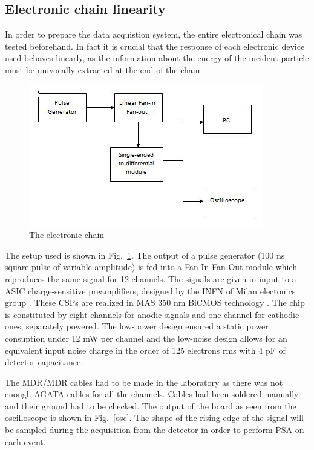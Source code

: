  \subsection{Electronic chain linearity}

In order to prepare the data acquistion system, the entire electronical chain
was tested beforehand. In fact it is crucial that the response of each
electronic device used behaves linearly, as the information about the energy
of the incident particle must be univocally extracted at the end of the chain.

\bigbreak

\begin{figure}[h]
  \centering
  \includegraphics[scale=.5]{img/electronic_chain_diagram.JPG}
  \caption{The electronic chain}
  \label{chain}
\end{figure}

\bigbreak

The setup used is shown in Fig.~\ref{chain}. The output of a pulse generator (\num{100} ns square pulse of variable amplitude) is fed into a Fan-In Fan-Out module which reproduces the same signal for 12 channels. The signals are given in input to a ASIC charge-sensitive preamplifiers, designed by the INFN of Milan electonics group \cite{charge:amp}. These CSPs are realized in MAS 350 nm BiCMOS technology \cite{bicmos}. The chip is constituted by eight channels for anodic signals and one channel for cathodic ones, separately powered. The low-power design ensured a static power consuption under 12 mW per channel and the low-noise design allows for an equivalent input noise charge in the order of 125 electrons rms with 4 pF of detector capacitance. 

\bigbreak

The MDR/MDR cables had to be made in the laboratory as there was not enough AGATA cables for all the channels. Cables had been soldered manually and their ground had to be checked.
The output of the board as seen from the oscilloscope is shown in Fig.~\ref{osc}. The shape of the rising edge of the signal will be sampled during the acquisition from the detector in order to perform PSA on each event.

